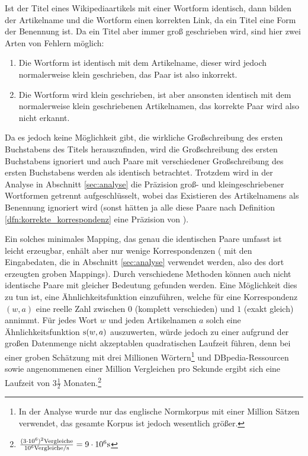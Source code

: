 Ist der Titel eines Wikipediaartikels mit einer Wortform identisch, dann bilden der Artikelname und die Wortform einen korrekten Link, da ein Titel eine Form der Benennung ist.
Da ein Titel aber immer groß geschrieben wird, sind hier zwei Arten von Fehlern möglich:
\begin{enumerate}
 \item Die Wortform ist identisch mit dem Artikelname, dieser wird jedoch normalerweise klein geschrieben, das Paar ist also inkorrekt.
 \item Die Wortform wird klein geschrieben, ist aber ansonsten identisch mit dem normalerweise klein geschriebenen Artikelnamen, das korrekte Paar wird also nicht erkannt.
\end{enumerate}
Da es jedoch keine Möglichkeit gibt, die wirkliche Großschreibung des ersten Buchstabens des Titels herauszufinden, wird die Großschreibung des ersten Buchstabens ignoriert und auch Paare mit 
verschiedener Großschreibung des ersten Buchstabens werden als identisch betrachtet.
Trotzdem wird in der Analyse in Abschnitt \ref{sec:analyse} die Präzision groß- und kleingeschriebener Wortformen getrennt aufgeschlüsselt, wobei das Existieren des Artikelnamens als Benennung ignoriert wird
(sonst hätten ja alle diese Paare nach Definition \ref{dfn:korrekte_korrespondenz} eine Präzision von ).

Ein solches minimales Mapping, das genau die identischen Paare umfasst ist leicht erzeugbar, %
enhält aber nur wenige Korrespondenzen ( mit den Eingabedaten, die in Abschnitt \ref{sec:analyse} verwendet werden, also  des dort erzeugten groben Mappings).
Durch verschiedene Methoden können auch nicht identische Paare mit gleicher Bedeutung gefunden werden.
Eine Möglichkeit dies zu tun ist, eine Ähnlichkeitsfunktion \s{} einzuführen, welche für eine Korrespondenz $(w,a)$ eine reelle Zahl zwischen $0$ (komplett verschieden) und $1$ (exakt gleich) annimmt.
Für jedes Wort $w$ und jeden Artikelnamen $a$ solch eine Ähnlichkeitsfunktion $\textnormal{s}(w,a)$ auszuwerten, würde jedoch zu einer aufgrund der großen Datenmenge nicht akzeptablen quadratischen Laufzeit führen,
denn bei einer groben Schätzung mit drei Millionen Wörtern\footnote{In der Analyse wurde nur das englische Normkorpus mit einer Million Sätzen verwendet, das gesamte Korpus ist jedoch wesentlich größer.}
und DBpedia-Ressourcen sowie angenommenen einer Million Vergleichen pro Sekunde ergibt sich eine Laufzeit von $3\frac{1}{2}$
Monaten.\footnote{$\frac{(3\cdot 10^6)^2\textnormal{Vergleiche}}{10^6 \textnormal{Vergleiche/s}} = 9 \cdot 10^6 \textnormal{s}$}


